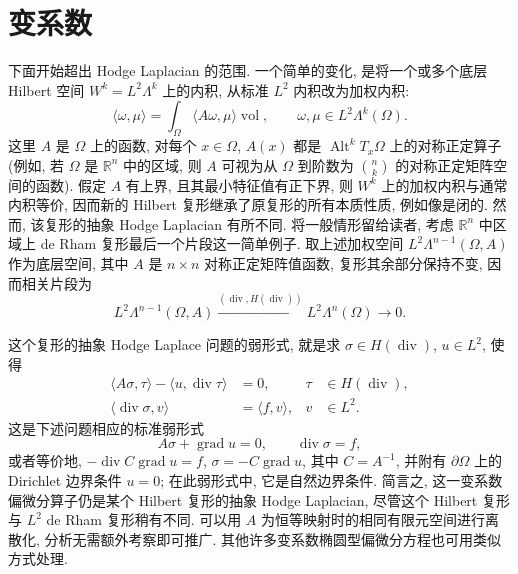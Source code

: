 \section{变系数}\label{sec:variable-coefficients}

下面开始超出 Hodge Laplacian 的范围. 一个简单的变化, 是将一个或多个底层 Hilbert 空间 $W^k=L^2\Lambda^k$ 上的内积, 从标准 $L^2$ 内积改为加权内积:
\[
\langle\omega,\mu\rangle=\int_\Omega\langle A\omega,\mu\rangle\operatorname{vol},\qquad\omega,\mu\in L^2\Lambda^k(\Omega).
\]
这里 $A$ 是 $\Omega$ 上的函数, 对每个 $x\in\Omega$, $A(x)$ 都是 $\operatorname{Alt}^kT_x\Omega$ 上的对称正定算子 (例如, 若 $\Omega$ 是 $\mathbb R^n$ 中的区域, 则 $A$ 可视为从 $\Omega$ 到阶数为 $\binom nk$ 的对称正定矩阵空间的函数). 假定 $A$ 有上界, 且其最小特征值有正下界, 则 $W^k$ 上的加权内积与通常内积等价, 因而新的 Hilbert 复形继承了原复形的所有本质性质, 例如像是闭的. 然而, 该复形的抽象 Hodge Laplacian 有所不同. 将一般情形留给读者, 考虑 $\mathbb R^n$ 中区域上 de Rham 复形最后一个片段这一简单例子. 取上述加权空间 $L^2\Lambda^{n-1}(\Omega,A)$ 作为底层空间, 其中 $A$ 是 $n\times n$ 对称正定矩阵值函数, 复形其余部分保持不变, 因而相关片段为
\begin{equation}\label{eq:weighted-divergence-complex}
L^2\Lambda^{n-1}(\Omega,A)\xrightarrow{(\operatorname{div},H(\operatorname{div}))}L^2\Lambda^n(\Omega)\to0.
\end{equation}

这个复形的抽象 Hodge Laplace 问题的弱形式, 就是求 $\sigma\in H(\operatorname{div})$, $u\in L^2$, 使得
\[
\begin{aligned}
\langle A\sigma,\tau\rangle-\langle u,\operatorname{div}\tau\rangle&=0,&\tau&\in H(\operatorname{div}),\\
\langle\operatorname{div}\sigma,v\rangle&=\langle f,v\rangle,&v&\in L^2.
\end{aligned}
\]
这是下述问题相应的标准弱形式
\[
A\sigma+\operatorname{grad}u=0,\qquad\operatorname{div}\sigma=f,
\]
或者等价地, $-\operatorname{div}C\operatorname{grad}u=f$, $\sigma=-C\operatorname{grad}u$, 其中 $C=A^{-1}$, 并附有 $\partial\Omega$ 上的 Dirichlet 边界条件 $u=0$; 在此弱形式中, 它是自然边界条件. 简言之, 这一变系数偏微分算子仍是某个 Hilbert 复形的抽象 Hodge Laplacian, 尽管这个 Hilbert 复形与 $L^2$ de Rham 复形稍有不同. 可以用 $A$ 为恒等映射时的相同有限元空间进行离散化, 分析无需额外考察即可推广. 其他许多变系数椭圆型偏微分方程也可用类似方式处理.
